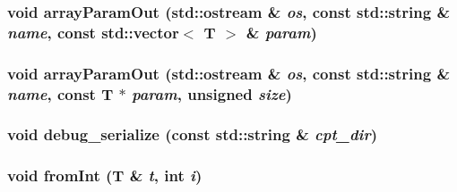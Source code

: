\label{serialize_8hh_a654936204c92d2f02a31f2962c0525d0}
\hypertarget{serialize_8hh_ad4c4cd1a113ab434793ff64e37e6abf5}{
\subsubsection[{arrayParamOut}]{\setlength{\rightskip}{0pt plus 5cm}void arrayParamOut (std::ostream \& {\em os}, \/  const std::string \& {\em name}, \/  const {\bf std::vector}$<$ T $>$ \& {\em param})}}
\label{serialize_8hh_ad4c4cd1a113ab434793ff64e37e6abf5}
\hypertarget{serialize_8hh_a4406c29ae068732e0341ace268084b5e}{
\subsubsection[{arrayParamOut}]{\setlength{\rightskip}{0pt plus 5cm}void arrayParamOut (std::ostream \& {\em os}, \/  const std::string \& {\em name}, \/  const T $\ast$ {\em param}, \/  unsigned {\em size})}}
\label{serialize_8hh_a4406c29ae068732e0341ace268084b5e}
\hypertarget{serialize_8hh_aa5d800dd5f65d4b270d9c4940374807f}{
\subsubsection[{debug\_\-serialize}]{\setlength{\rightskip}{0pt plus 5cm}void debug\_\-serialize (const std::string \& {\em cpt\_\-dir})}}
\label{serialize_8hh_aa5d800dd5f65d4b270d9c4940374807f}
\hypertarget{serialize_8hh_a6871086760ac1e83663ad779e6160bf6}{
\subsubsection[{fromInt}]{\setlength{\rightskip}{0pt plus 5cm}void fromInt (T \& {\em t}, \/  int {\em i})}}
\label{serialize_8hh_a6871086760ac1e83663ad779e6160bf6}




